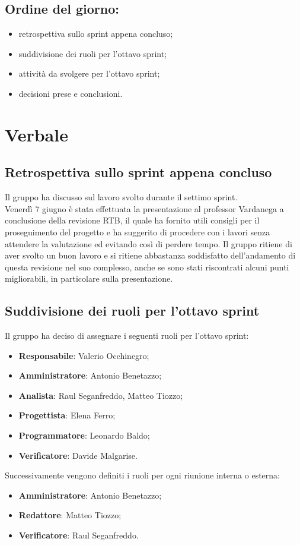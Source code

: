 \documentclass[italian,12pt]{article}
\begin{document}
\subsection*{Ordine del giorno:}
\begin{itemize}
	\item retrospettiva sullo sprint appena concluso;
	\item suddivisione dei ruoli per l'ottavo sprint;
	\item attività da svolgere per l'ottavo sprint;
	\item decisioni prese e conclusioni.
\end{itemize}

\newpage

\section{Verbale}

\subsection{Retrospettiva sullo sprint appena concluso}
Il gruppo ha discusso sul lavoro svolto durante il settimo sprint. \\
Venerdì 7 giugno è stata effettuata la presentazione al professor Vardanega a conclusione della revisione RTB, il quale ha fornito utili consigli per il proseguimento del progetto e ha suggerito di procedere con i lavori senza attendere la valutazione ed evitando così di perdere tempo. Il gruppo ritiene di aver svolto un buon lavoro e si ritiene abbastanza soddisfatto dell'andamento di questa revisione nel suo complesso, anche se sono stati riscontrati alcuni punti migliorabili, in particolare sulla presentazione.

\subsection{Suddivisione dei ruoli per l'ottavo sprint}
Il gruppo ha deciso di assegnare i seguenti ruoli per l'ottavo sprint:
\begin{itemize}
	\item \textbf{Responsabile}: Valerio Occhinegro;
	\item \textbf{Amministratore}: Antonio Benetazzo;
	\item \textbf{Analista}: Raul Seganfreddo, Matteo Tiozzo;
	\item \textbf{Progettista}: Elena Ferro;
	\item \textbf{Programmatore}: Leonardo Baldo;
	\item \textbf{Verificatore}: Davide Malgarise.
\end{itemize}
Successivamente vengono definiti i ruoli per ogni riunione interna o esterna:
\begin{itemize}
	\item \textbf{Amministratore}: Antonio Benetazzo;
	\item \textbf{Redattore}: Matteo Tiozzo;
	\item \textbf{Verificatore}: Raul Seganfreddo.
\end{itemize}
\end{document}
